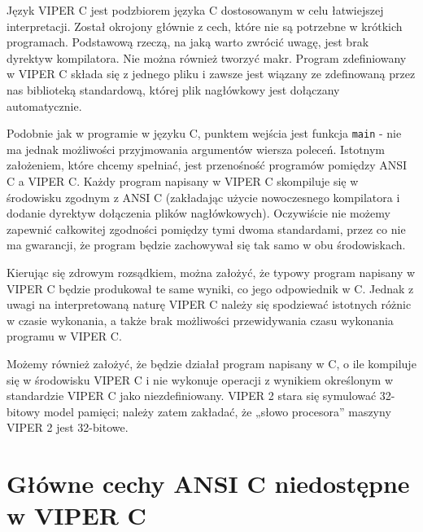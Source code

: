 \documentclass[a4paper,twoside,openright,11pt]{report}
\begin{document}
\par Język VIPER C jest podzbiorem języka C dostosowanym w celu łatwiejszej interpretacji. Został okrojony głównie z cech, które nie są potrzebne w krótkich programach. Podstawową rzeczą, na jaką warto zwrócić uwagę, jest brak dyrektyw kompilatora. Nie można również tworzyć makr. Program zdefiniowany w VIPER C składa się z jednego pliku i zawsze jest wiązany ze zdefinowaną przez nas biblioteką standardową, której plik nagłówkowy jest dołączany automatycznie. 
\par Podobnie jak w programie w języku C, punktem wejścia jest funkcja \texttt{main} - nie ma jednak możliwości przyjmowania argumentów wiersza poleceń. Istotnym założeniem, które chcemy spełniać, jest przenośność programów pomiędzy ANSI C a VIPER C. Każdy program napisany w VIPER C skompiluje się w środowisku zgodnym z ANSI C (zakładając użycie nowoczesnego kompilatora i dodanie dyrektyw dołączenia plików nagłówkowych). Oczywiście nie możemy zapewnić całkowitej zgodności pomiędzy tymi dwoma standardami, przez co nie ma gwarancji, że program będzie zachowywał się tak samo w obu środowiskach. \par Kierując się zdrowym rozsądkiem, można założyć, że typowy program napisany w VIPER C będzie produkował te same wyniki, co jego odpowiednik w C. Jednak z uwagi na interpretowaną naturę VIPER C należy się spodziewać istotnych różnic w czasie wykonania, a także brak możliwości przewidywania czasu wykonania programu w VIPER C. 
\par Możemy również założyć, że będzie działał program napisany w C, o ile kompiluje się w środowisku VIPER C i nie wykonuje operacji z wynikiem określonym w standardzie VIPER C jako niezdefiniowany. VIPER 2 stara się symulować 32-bitowy model pamięci; należy zatem zakładać, że „słowo procesora” maszyny VIPER 2 jest 32-bitowe. 

  \section {Główne cechy ANSI C niedostępne w VIPER C}
\end{document}
